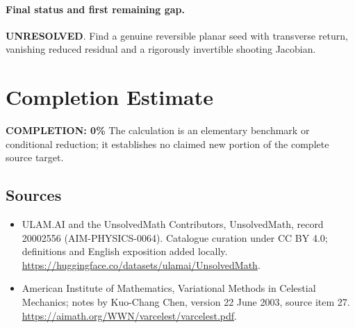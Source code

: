 \documentclass[11pt]{article}
\begin{document}
\paragraph{Final status and first remaining gap.}
\textbf{UNRESOLVED}. Find a genuine reversible planar seed with transverse return, vanishing reduced residual and a rigorously invertible shooting Jacobian.

\section{Completion Estimate}
\noindent\textbf{COMPLETION: 0\%}
The calculation is an elementary benchmark or conditional reduction; it establishes no claimed new portion of the complete source target.

\subsection{Sources}
\begin{itemize}
\item[\hypertarget{source:20002556:1}{S1}] ULAM.AI and the UnsolvedMath Contributors, UnsolvedMath, record 20002556 (AIM-PHYSICS-0064). Catalogue curation under CC BY 4.0; definitions and English exposition added locally.
\url{https://huggingface.co/datasets/ulamai/UnsolvedMath}.
\item[\hypertarget{source:20002556:2}{S2}] American Institute of Mathematics, Variational Methods in Celestial Mechanics; notes by Kuo-Chang Chen, version 22 June 2003, source item 27.
\url{https://aimath.org/WWN/varcelest/varcelest.pdf}.
\end{itemize}
\label{end:20002556}
\end{document}

